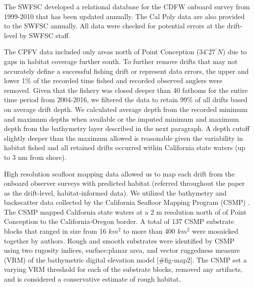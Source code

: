 \documentclass[
  12pt,
  authoryear,
  preprint,
  3p]{elsarticle}
\begin{document}
The SWFSC developed a relational database for the CDFW onboard survey
from 1999-2010\citeyearpar{Monk:2014:DRD} that has been updated
annually. The Cal Poly data are also provided to the SWFSC annually. All
data were checked for potential errors at the drift-level by SWFSC
staff.

The CPFV data included only areas north of Point Conception
(\(34^\circ 27^\prime N\)) due to gaps in habitat coverage further
south. To further remove drifts that may not accurately define a
successful fishing drift or represent data errors, the upper and lower
1\% of the recorded time fished and recorded observed anglers were
removed. Given that the fishery was closed deeper than 40 fathoms for
the entire time period from 2004-2016, we filtered the data to retain
99\% of all drifts based on average drift depth. We calculated average
depth from the recorded minimum and maximum depths when available or the
imputed minimum and maximum depth from the bathymetry layer described in
the next paragraph. A depth cutoff slightly deeper than the maximum
allowed is reasonable given the variability in habitat fished and all
retained drifts occurred within California state waters (up to 3 nm from
shore).

High resolution seafloor mapping data allowed us to map each drift from
the onboard observer surveys with predicted habitat (referred throughout
the paper as the drift-level, habitat-informed data). We utilized the
bathymetry and backscatter data collected by the California Seafloor
Mapping Program (CSMP) \citep{Golden:2013:CSW}. The CSMP mapped
California state waters at a 2 m resolution north of of Point Conception
to the California-Oregon border. A total of 137 CSMP substrate blocks
that ranged in size from 16 \(km^2\) to more than 400 \(km^2\) were
mosaicked together by authors. Rough and smooth substrates were
identified by CSMP using two rugosity indices, surface:planar area, and
vector ruggedness measure (VRM) of the bathymetric digital elevation
model {[}\#fig-map2{]}. The CSMP set a varying VRM threshold for each of
the substrate blocks, removed any artifacts, and is considered a
conservative estimate of rough habitat.
\end{document}
